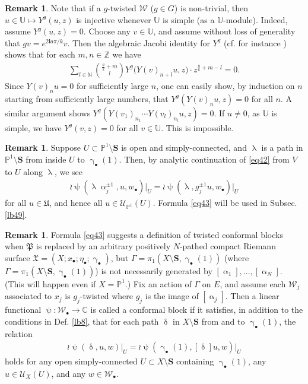 \documentclass[11pt,b5paper,notitlepage]{article}
\theoremstyle{definition}
\newtheorem{rem}[df]{Remark}
\theoremstyle{plain}
\newcommand{\fk}{\mathfrak}
\newcommand{\mc}{\mathcal}
\newcommand{\scr}{\mathscr}
\newcommand{\im}{\mathbf{i}}
\newcommand{\blt}{\bullet}
\newcommand{\Ubb}{\mathbb U}
\newcommand{\Cbb}{\mathbb C}
\newcommand{\Nbb}{\mathbb N}
\newcommand{\Zbb}{\mathbb Z}
\newcommand{\Pbb}{\mathbb P}
\newcommand{\Sbf}{\mathbf{S}}
\numberwithin{equation}{subsection}
\begin{document}
\begin{rem}
	Note that if a $g$-twisted $\mc W$ ($g\in G$) is non-trivial, then $u\in\Ubb\mapsto Y^g(u,z)$ is injective whenever $\Ubb$ is simple (as a $\Ubb$-module). Indeed, assume $Y^g(u,z)=0$. Choose any $v\in \Ubb$, and assume without loss of generality that $gv=e^{2\im a\pi/k}v$. Then the algebraic Jacobi identity for $Y^g$ (cf. for instance \cite[Sec. 10]{Gui24b}) shows that for each $m,n\in\Zbb$ we have
	\begin{align*}
		\sum_{l\in\Nbb}{\frac ak+m\choose l} Y^g\big(Y(v)_{n+l}u,z\big)\cdot z^{\frac ak+m-l}=0.
	\end{align*}
	Since $Y(v)_nu=0$ for sufficiently large $n$, one can easily show, by induction on $n$ starting from sufficiently large numbers, that $Y^g(Y(v)_nu,z)=0$ for all $n$. A similar argument shows $Y^g(Y(v_1)_{n_1}\cdots Y(v_l)_{n_l}u,z)=0$. If $u\neq 0$, as $\Ubb$ is simple, we have $Y^g(v,z)=0$ for all $v\in\Ubb$. This is impossible.
\end{rem}


\begin{rem}
	Suppose $U\subset\Pbb^1\setminus\Sbf$ is open and simply-connected, and $\uplambda$ is a path in $\Pbb^1\setminus\Sbf$ from inside $U$ to $\upgamma_\blt(1)$. Then, by analytic continuation of \eqref{eq42} from $V$ to $U$ along $\uplambda$, we see
	\begin{align}
		\wr\uppsi(\uplambda\upalpha_j^{\pm1},u,w_\blt)\big|_U=	\wr\uppsi(\uplambda,g_j^{\pm1}u,w_\blt)\big|_U\label{eq43}
	\end{align}
	for all $u\in\fk U$, and hence all $u\in\scr U_{\Pbb^1}(U)$. Formula \eqref{eq43} will be used in Subsec. \ref{lb49}.
\end{rem}


\begin{rem}\label{lb64}
Formula \eqref{eq43} suggests a definition of twisted conformal blocks when $\fk P$ is replaced by an arbitrary positively $N$-pathed compact Riemann surface $\fk X=(X;x_\blt;\eta_\blt;\upgamma_\blt)$, but  $\Gamma=\pi_1(X\setminus\Sbf,\upgamma_\blt(1))$ (where $\Gamma=\pi_1(X\setminus\Sbf,\upgamma_\blt(1))$) is not necessarily generated by $[\upalpha_1],\dots,[\upalpha_N]$. (This will happen even if $X=\Pbb^1$.) Fix an action of $\Gamma$ on $E$, and assume each $\mc W_j$ associated to $x_j$ is $g_j$-twisted where $g_j$ is the image of $[\upalpha_j]$. Then a  linear functional $\uppsi:\mc W_\blt\rightarrow\Cbb$ is called a  conformal block  if it satisfies, in addition to the conditions in Def. \ref{lb8}, that for each path $\updelta$ in $X\setminus\Sbf$ from and to $\upgamma_\blt(1)$, the relation
\begin{align}
\wr\uppsi(\updelta,u,w)\big|_U=	\wr\uppsi(\upgamma_\blt(1),[\updelta]u,w)\big|_U	
\end{align}
holds for any open simply-connected $U\subset X\setminus\Sbf$ containing $\upgamma_\blt(1)$, any $u\in\scr U_X(U)$, and any $w\in\mc W_\blt$.
\end{rem}
\end{document}
